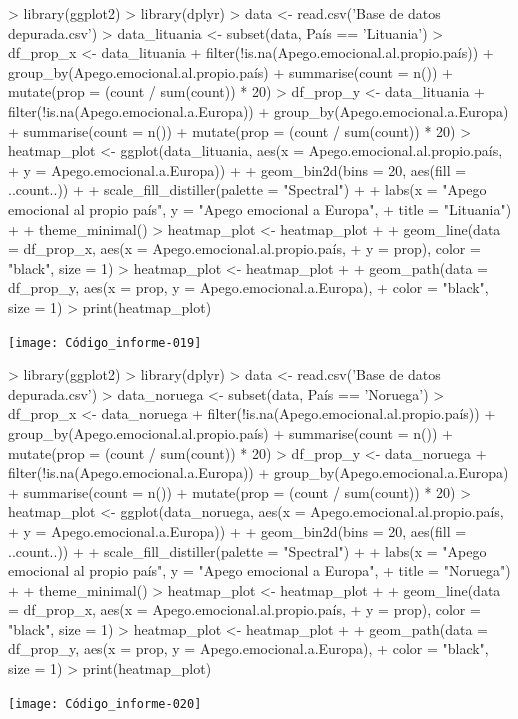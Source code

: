 \documentclass{article}
\begin{document}
\newpage
\begin{Schunk}
\begin{Sinput}
> library(ggplot2)
> library(dplyr)
> data <- read.csv('Base de datos depurada.csv')
> data_lituania <- subset(data, País == 'Lituania')
> df_prop_x <- data_lituania %
+   filter(!is.na(Apego.emocional.al.propio.país)) %
+   group_by(Apego.emocional.al.propio.país) %
+   summarise(count = n()) %
+   mutate(prop = (count / sum(count)) * 20)
> df_prop_y <- data_lituania %
+   filter(!is.na(Apego.emocional.a.Europa)) %
+   group_by(Apego.emocional.a.Europa) %
+   summarise(count = n()) %
+   mutate(prop = (count / sum(count)) * 20)
> heatmap_plot <- ggplot(data_lituania, aes(x = Apego.emocional.al.propio.país,
+                                  y = Apego.emocional.a.Europa)) +
+   geom_bin2d(bins = 20, aes(fill = ..count..)) +
+   scale_fill_distiller(palette = "Spectral") +
+   labs(x = "Apego emocional al propio país", y = "Apego emocional a Europa",
+        title = "Lituania") +
+   theme_minimal()
> heatmap_plot <- heatmap_plot +
+   geom_line(data = df_prop_x, aes(x = Apego.emocional.al.propio.país,
+                                   y = prop), color = "black", size = 1)
> heatmap_plot <- heatmap_plot +
+   geom_path(data = df_prop_y, aes(x = prop, y = Apego.emocional.a.Europa),
+             color = "black", size = 1)
> print(heatmap_plot)
\end{Sinput}
\end{Schunk}
\texttt{[image: Código\_informe-019]}

\newpage
\begin{Schunk}
\begin{Sinput}
> library(ggplot2)
> library(dplyr)
> data <- read.csv('Base de datos depurada.csv')
> data_noruega <- subset(data, País == 'Noruega')
> df_prop_x <- data_noruega %
+   filter(!is.na(Apego.emocional.al.propio.país)) %
+   group_by(Apego.emocional.al.propio.país) %
+   summarise(count = n()) %
+   mutate(prop = (count / sum(count)) * 20)
> df_prop_y <- data_noruega %
+   filter(!is.na(Apego.emocional.a.Europa)) %
+   group_by(Apego.emocional.a.Europa) %
+   summarise(count = n()) %
+   mutate(prop = (count / sum(count)) * 20)
> heatmap_plot <- ggplot(data_noruega, aes(x = Apego.emocional.al.propio.país,
+                                  y = Apego.emocional.a.Europa)) +
+   geom_bin2d(bins = 20, aes(fill = ..count..)) +
+   scale_fill_distiller(palette = "Spectral") +
+   labs(x = "Apego emocional al propio país", y = "Apego emocional a Europa",
+        title = "Noruega") +
+   theme_minimal()
> heatmap_plot <- heatmap_plot +
+   geom_line(data = df_prop_x, aes(x = Apego.emocional.al.propio.país,
+                                   y = prop), color = "black", size = 1)
> heatmap_plot <- heatmap_plot +
+   geom_path(data = df_prop_y, aes(x = prop, y = Apego.emocional.a.Europa),
+             color = "black", size = 1)
> print(heatmap_plot)
\end{Sinput}
\end{Schunk}
\texttt{[image: Código\_informe-020]}
\end{document}
